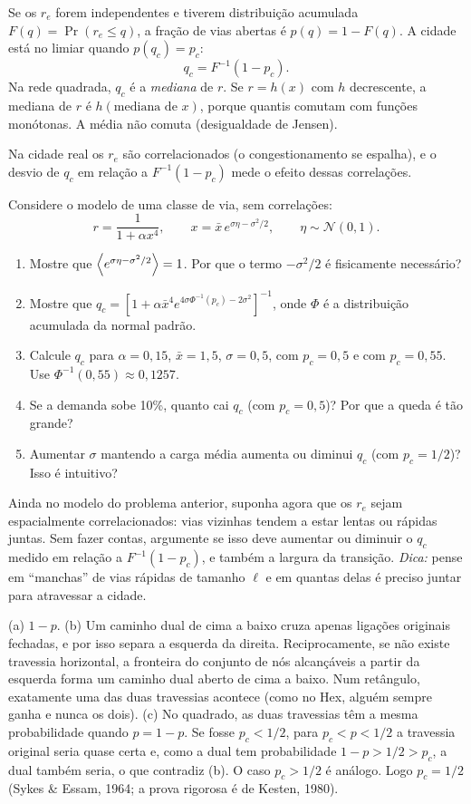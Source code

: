 \documentclass[11pt]{article}
\begin{document}
\begin{ideia}
Se os $r_e$ forem independentes e tiverem distribuição acumulada $F(q) = \Pr(r_e\le q)$, a fração de vias abertas é $p(q) = 1-F(q)$. A cidade está no limiar quando $p(q_c) = p_c$:
\[
q_c = F^{-1}(1-p_c).
\]
Na rede quadrada, $q_c$ é a \emph{mediana} de $r$. Se $r=h(x)$ com $h$ decrescente, a mediana de $r$ é $h(\text{mediana de }x)$, porque quantis comutam com funções monótonas. A média não comuta (desigualdade de Jensen).
\end{ideia}

Na cidade real os $r_e$ são correlacionados (o congestionamento se espalha), e o desvio de $q_c$ em relação a $F^{-1}(1-p_c)$ mede o efeito dessas correlações.

 Considere o modelo de uma classe de via, sem correlações:
\[
r = \frac{1}{1+\alpha x^4},\qquad x = \bar x\,e^{\sigma\eta-\sigma^2/2},\qquad \eta\sim\mathcal N(0,1).
\]
\begin{enumerate}
  \item Mostre que $\left\langle e^{\sigma\eta-\sigma^2/2} \right\rangle=1$. Por que o termo $-\sigma^2/2$ é fisicamente necessário?
  \item Mostre que $q_c = \left[1+\alpha\bar x^4 e^{4\sigma\Phi^{-1}(p_c)-2\sigma^2}\right]^{-1}$, onde $\Phi$ é a distribuição acumulada da normal padrão.
  \item Calcule $q_c$ para $\alpha=0{,}15$, $\bar x = 1{,}5$, $\sigma=0{,}5$, com $p_c=0{,}5$ e com $p_c=0{,}55$. Use $\Phi^{-1}(0{,}55)\approx 0{,}1257$.
  \item Se a demanda sobe 10\%, quanto cai $q_c$ (com $p_c=0{,}5$)? Por que a queda é tão grande?
  \item Aumentar $\sigma$ mantendo a carga média aumenta ou diminui $q_c$ (com $p_c=1/2$)? Isso é intuitivo?
\end{enumerate}

 Ainda no modelo do problema anterior, suponha agora que os $r_e$ sejam espacialmente correlacionados: vias vizinhas tendem a estar lentas ou rápidas juntas. Sem fazer contas, argumente se isso deve aumentar ou diminuir o $q_c$ medido em relação a $F^{-1}(1-p_c)$, e também a largura da transição. \emph{Dica:} pense em ``manchas'' de vias rápidas de tamanho $\ell$ e em quantas delas é preciso juntar para atravessar a cidade.

\solucoes

(a) $1-p$. (b) Um caminho dual de cima a baixo cruza apenas ligações originais fechadas, e por isso separa a esquerda da direita. Reciprocamente, se não existe travessia horizontal, a fronteira do conjunto de nós alcançáveis a partir da esquerda forma um caminho dual aberto de cima a baixo. Num retângulo, exatamente uma das duas travessias acontece (como no Hex, alguém sempre ganha e nunca os dois). (c) No quadrado, as duas travessias têm a mesma probabilidade quando $p=1-p$. Se fosse $p_c<1/2$, para $p_c<p<1/2$ a travessia original seria quase certa e, como a dual tem probabilidade $1-p>1/2>p_c$, a dual também seria, o que contradiz (b). O caso $p_c>1/2$ é análogo. Logo $p_c=1/2$ (Sykes \& Essam, 1964; a prova rigorosa é de Kesten, 1980).
\end{document}
